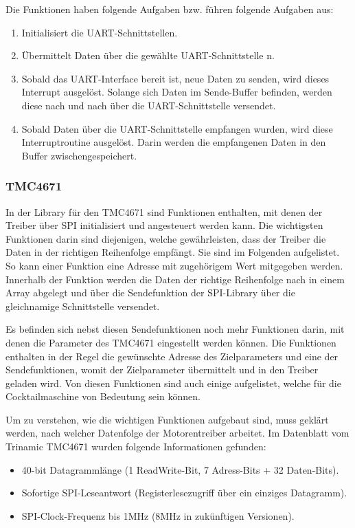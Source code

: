 Die Funktionen haben folgende Aufgaben bzw. führen folgende Aufgaben aus:

\begin{enumerate}
\item Initialisiert die UART-Schnittstellen.
\item Übermittelt Daten über die gewählte UART-Schnittstelle n.
\item Sobald das UART-Interface bereit ist, neue Daten zu senden, wird dieses Interrupt ausgelöst. Solange sich Daten im Sende-Buffer befinden, werden diese nach und nach über die UART-Schnittstelle versendet.
\item Sobald Daten über die UART-Schnittstelle empfangen wurden, wird diese Interruptroutine ausgelöst. Darin werden die empfangenen Daten in den Buffer zwischengespeichert.
\end{enumerate}

\subsubsection{TMC4671}\label{subsubsec:Software_TMC4671}

In der Library für den TMC4671 sind Funktionen enthalten, mit denen der Treiber über SPI initialisiert und angesteuert werden kann. Die wichtigsten Funktionen darin sind diejenigen, welche gewährleisten, dass der Treiber die Daten in der richtigen Reihenfolge empfängt. Sie sind im Folgenden aufgelistet. So kann einer Funktion eine Adresse mit zugehörigem Wert mitgegeben werden. Innerhalb der Funktion werden die Daten der richtige Reihenfolge nach in einem Array abgelegt und über die Sendefunktion der SPI-Library über die gleichnamige Schnittstelle versendet. 

Es befinden sich nebst diesen Sendefunktionen noch mehr Funktionen darin, mit denen die Parameter des TMC4671 eingestellt werden können. Die Funktionen enthalten in der Regel die gewünschte Adresse des Zielparameters und eine der Sendefunktionen, womit der Zielparameter übermittelt und in den Treiber geladen wird. Von diesen Funktionen sind auch einige aufgelistet, welche für die Cocktailmaschine von Bedeutung sein können.

Um zu verstehen, wie die wichtigen Funktionen aufgebaut sind, muss geklärt werden, nach welcher Datenfolge der Motorentreiber arbeitet. Im Datenblatt vom Trinamic TMC4671 wurden folgende Informationen gefunden:

\begin{itemize}
\item 40-bit Datagrammlänge (1 ReadWrite-Bit, 7 Adress-Bits + 32 Daten-Bits).
\item Sofortige SPI-Leseantwort (Registerlesezugriff über ein einziges Datagramm).
\item SPI-Clock-Frequenz bis 1MHz (8MHz in zukünftigen Versionen).
\end{itemize}

